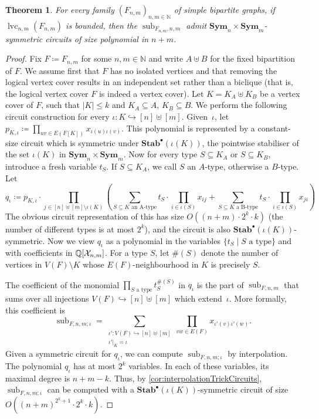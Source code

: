 \documentclass[11pt, DIV=15]{scrarticle}
\theoremstyle{definition}
\theoremstyle{plain}
\newtheorem{theorem}[definition]{Theorem}
\theoremstyle{remark}
\newcommand{\Xx}{{\cal X}}
\DeclareMathOperator{\sub}{sub}
\DeclareMathOperator{\cc}{lvc}
\newcommand{\Sym}{\mathbf{Sym}}
\newcommand{\Stab}{\mathbf{Stab}}
\newcommand{\StabP}{\Stab^{\bullet}}
\newcommand{\bbQ}{\mathbb{Q}}
\begin{document}
	\begin{theorem}\label{thm:sub-small-circuit}
		For every family  $(F_{n,m})_{n,m \in \mathbb{N}}$ of simple bipartite graphs,
		if $\cc_{n,m}(F_{n,m})$ is bounded,
		then the $\sub_{F_{n,m}, n,m}$ admit  $\Sym_n \times \Sym_m$-symmetric circuits of size polynomial in $n+m$.
	\end{theorem}
	\begin{proof}
		Fix $F \coloneqq F_{n,m}$ for some $n,m \in \mathbb{N}$ and write $A \uplus B$ for the fixed bipartition of $F$.
		We assume first that $F$ has no isolated vertices and that removing the logical vertex cover results in an independent set rather than a biclique (that is, the logical vertex cover $F$ is indeed a vertex cover).
		Let $K = K_A \uplus K_B$ be a vertex cover of $F$, such that $|K| \leq k$ and $K_A \subseteq A$, $K_B \subseteq B$. We perform the following circuit construction for every $\iota\colon K \hookrightarrow [n] \uplus [m]$. 
		Given~$\iota$, let $p_{K,\iota} \coloneqq \prod_{uv \in E(F[K])} x_{\iota(u)\iota(v)}$. 
		This polynomial is represented by a constant-size circuit which is symmetric under $\StabP(\iota(K))$, the pointwise stabiliser of the set $\iota(K)$ in $\Sym_n \times \Sym_m$.
		Now for every type $S \subseteq K_A$ or $S \subseteq K_B$, introduce a fresh variable $t_S$. If $S \subseteq K_A$, we call $S$ an $A$-type, otherwise a $B$-type. Let
		\[
		q_{\iota} \coloneqq p_{K,\iota} \cdot \prod_{j \in [n] \uplus [m] \setminus \iota(K)} \left( \sum_{S \subseteq K \text{ an A-type} } t_S \cdot \prod_{i \in \iota(S)} x_{ij} + \sum_{S \subseteq K \text{ a B-type} }  t_S \cdot \prod_{i \in \iota(S)} x_{ji}\right)
		\]
		The obvious circuit representation of this has size $O((n+m) \cdot 2^k \cdot k)$ (the number of different types is at most $2^k$), and the circuit is also $\StabP(\iota(K))$-symmetric.
		Now we view $q_{\iota}$ as a polynomial in the variables $\{t_S \mid S \text{ a type} \}$ and with coefficients in $\bbQ[\Xx_{n,m}]$.
		For a type $S$, let $\#(S)$ denote the number of vertices in $V(F) \setminus K$ whose $E(F)$-neighbourhood in $K$ is precisely $S$.
		
		The coefficient of the monomial $\prod_{S \text{ a type}} t^{\#(S)}_S$ in $q_{\iota}$ is the part of $\sub_{F,n,m}$ that sums over all injections $V(F) \hookrightarrow [n] \uplus [m]$ which extend~$\iota$. More formally, this coefficient is
		\[
		\sub_{F,n,m;\iota} = \sum_{\substack{\iota' \colon V(F) \hookrightarrow [n] \uplus [m] \\ \iota'|_K = \iota}} \prod_{vw \in E(F)} x_{\iota'(v)\iota'(w)} .
		\]
		Given a symmetric circuit for $q_{\iota}$, we can compute $\sub_{F,n,m;\iota}$ by interpolation. 
		The polynomial $q_\iota$ has at most $2^k$ variables.
		In each of these variables, its maximal degree is $n+m-k$.
		Thus, by \cref{cor:interpolationTrickCircuits}, $\sub_{F,n,m;\iota}$ can be computed with a $\StabP(\iota(K))$-symmetric circuit of size $O((n+m)^{2^k+1} \cdot 2^k \cdot k)$.
		

\end{proof}
\end{document}
